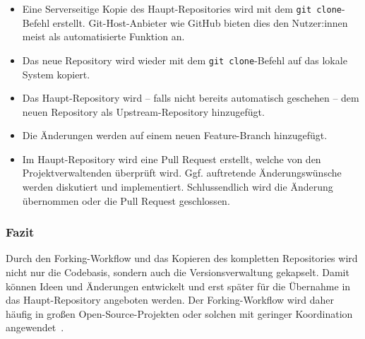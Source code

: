 \begin{itemize}
    \item Eine Serverseitige Kopie des Haupt\hyp Repositories wird mit dem \texttt{git clone}-Befehl erstellt. Git\hyp Host\hyp Anbieter wie GitHub bieten dies den Nutzer:innen meist als automatisierte Funktion an.
    
    \item Das neue Repository wird wieder mit dem \texttt{git clone}-Befehl auf das lokale System kopiert.
    
    \item Das Haupt\hyp Repository wird -- falls nicht bereits automatisch geschehen -- dem neuen Repository als Upstream\hyp Repository hinzugefügt.
    
    \item Die Änderungen werden auf einem neuen Feature\hyp Branch hinzugefügt.
    
    \item Im Haupt\hyp Repository wird eine Pull Request erstellt, welche von den Projektverwaltenden überprüft wird. Ggf. auftretende Änderungswünsche werden diskutiert und implementiert. Schlussendlich wird die Änderung übernommen oder die Pull Request geschlossen.
\end{itemize}


\subsubsection{Fazit}

Durch den Forking\hyp Workflow und das Kopieren des kompletten Repositories wird nicht nur die Codebasis, sondern auch die Versionsverwaltung gekapselt. Damit können Ideen und Änderungen entwickelt und erst später für die Übernahme in das Haupt\hyp Repository angeboten werden. Der Forking\hyp Workflow wird daher häufig in großen Open\hyp Source\hyp Projekten oder solchen mit geringer Koordination angewendet~\cite{github_inc_contributing_2023}.
